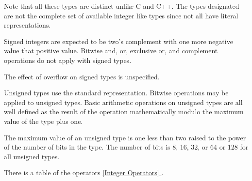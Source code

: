 \documentclass[oneside]{book}
\newcommand*{\fullref}[1]{\hyperref[{#1}]{\autoref*{#1} \nameref*{#1}}}
\begin{document}
Note that all these types are distinct unlike C and C++.
The types designated are not the complete set of available
integer like types since not all have literal representations.

Signed integers are expected to be two's complement with one
more negative value that positive value. Bitwise and,
or, exclusive or, and complement operations do not apply
with signed types.

The effect of overflow on signed types is unspecified.

Unsigned types use the standard representation. 
Bitwise operations may be applied to unsigned types.
Basic arithmetic operations on unsigned types are
all well defined as the result of the operation
mathematically modulo the maximum value of the type
plus one.

The maximum value of an unsigned type is one less than
two raised to the power of the number of bits in the type.
The number of bits is 8, 16, 32, or 64 or 128 for all unsigned types.

There is a table of the operators \fullref{Integer Operators}.
\end{document}
